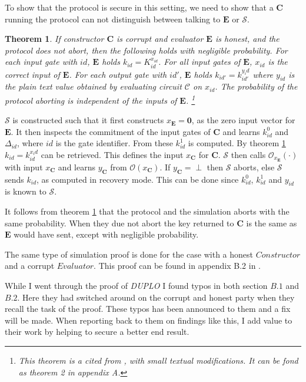 \documentclass[twoside,11pt,openright]{report}
\newtheorem{theorem}{Theorem}
\newcommand{\DUPLO}{\textit{DUPLO} }
\begin{document}
To show that the protocol is secure in this setting, we need to show that a $\mathbf{C}$ running the protocol can not distinguish between talking to $\mathbf{E}$ or $\mathcal{S}$.

\begin{theorem}
\label{thm:2}
If constructor $\mathbf{C}$ is corrupt and evaluator $\mathbf{E}$ is honest, and the protocol does not abort, then the following holds with negligible probability. For each input gate with $id$, $\mathbf{E}$ holds $k_{id}=K^{x_{id}}_{id}$. For all input gates of $\mathbf{E}$, $x_{id}$ is the correct input of $\mathbf{E}$. For each output gate with $id'$, $\mathbf{E}$ holds $k_{id'}=k^{y_id}_{id'}$ where $y_{id}$ is the plain text value obtained by evaluating circuit $\mathcal{C}$ on $x_{id}$. The probability of the protocol aborting is independent of the inputs of $\mathbf{E}$.
\footnote{This theorem is a cited from \cite{duplo}, with small textual modifications. It can be fond as theorem 2 in appendix A.}
\end{theorem}

$\mathcal{S}$ is constructed such that it first constructs $x_\mathbf{E}=\mathbf{0}$, as the zero input vector for $\mathbf{E}$. It then inspects the commitment of the input gates of $\mathbf{C}$ and learns $k^0_{id}$ and $\Delta_{id}$, where $id$ is the gate identifier. From these $k^1_{id}$ is computed. By theorem \ref{thm:2} $k_{id}=k^{x_id}_{id}$ can be retrieved. This defines the input $x_\mathbf{C}$ for $\mathbf{C}$. $\mathcal{S}$ then calls $\mathcal{O}_{x_\mathbf{E}}(\cdot)$ with input $x_\mathbf{C}$ and learns $y_\mathbf{C}$ from $\mathcal{O}(x_\mathbf{C})$. If $y_\mathbf{C}=\perp$ then $\mathcal{S}$ aborts, else $\mathcal{S}$ sends $k_{id}$, as computed in recovery mode. This can be done since $k^0_{id}$, $k^1_{id}$ and $y_{id}$ is known to $\mathcal{S}$.

It follows from theorem \ref{thm:2} that the protocol and the simulation aborts with the same probability. When they due not abort the key returned to $\mathbf{C}$ is the same as $\mathbf{E}$ would have sent, except with negligible probability.

The same type of simulation proof is done for the case with a honest $Constructor$ and a corrupt $Evaluator$. This proof can be found in appendix B.2 in \cite{duplo}.

\bigskip

While I went through the proof of \DUPLO I found typos in both section $B.1$ and $B.2$. Here they had switched around on the corrupt and honest party when they recall the task of the proof. These typos has been announced to them and a fix will be made. When reporting back to them on findings like this, I add value to their work by helping to secure a better end result.
\end{document}
